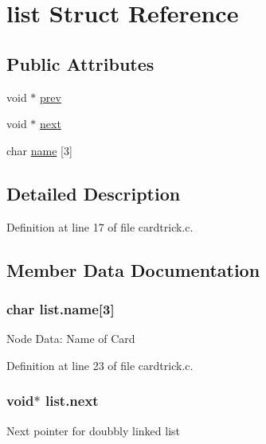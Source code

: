 \hypertarget{structlist}{
\section{list Struct Reference}
\label{structlist}
}
\subsection*{Public Attributes}
\begin{DoxyCompactItemize}
\item 
void $\ast$ \hyperlink{structlist_a5632e373e65bcebe2f020d52e03c316b}{prev}
\item 
void $\ast$ \hyperlink{structlist_a3cae300320ef76cd5f7b137b87c34026}{next}
\item 
char \hyperlink{structlist_aeac3a997d73aced972ea80c87e9a1d0d}{name} \mbox{[}3\mbox{]}
\end{DoxyCompactItemize}


\subsection{Detailed Description}


Definition at line 17 of file cardtrick.c.



\subsection{Member Data Documentation}
\hypertarget{structlist_aeac3a997d73aced972ea80c87e9a1d0d}{
\subsubsection[{name}]{\setlength{\rightskip}{0pt plus 5cm}char {\bf list.name}\mbox{[}3\mbox{]}}}
\label{structlist_aeac3a997d73aced972ea80c87e9a1d0d}
Node Data: Name of Card 

Definition at line 23 of file cardtrick.c.

\hypertarget{structlist_a3cae300320ef76cd5f7b137b87c34026}{
\subsubsection[{next}]{\setlength{\rightskip}{0pt plus 5cm}void$\ast$ {\bf list.next}}}
\label{structlist_a3cae300320ef76cd5f7b137b87c34026}
Next pointer for doubbly linked list 


